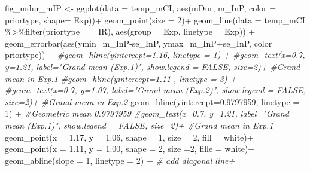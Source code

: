 \documentclass[
]{article}
\newenvironment{Shaded}{\begin{snugshade}}{\end{snugshade}}
\newcommand{\AttributeTok}[1]{\textcolor[rgb]{0.77,0.63,0.00}{#1}}
\newcommand{\CommentTok}[1]{\textcolor[rgb]{0.56,0.35,0.01}{\textit{#1}}}
\newcommand{\DecValTok}[1]{\textcolor[rgb]{0.00,0.00,0.81}{#1}}
\newcommand{\FloatTok}[1]{\textcolor[rgb]{0.00,0.00,0.81}{#1}}
\newcommand{\FunctionTok}[1]{\textcolor[rgb]{0.00,0.00,0.00}{#1}}
\newcommand{\NormalTok}[1]{#1}
\newcommand{\OtherTok}[1]{\textcolor[rgb]{0.56,0.35,0.01}{#1}}
\newcommand{\SpecialCharTok}[1]{\textcolor[rgb]{0.00,0.00,0.00}{#1}}
\newcommand{\StringTok}[1]{\textcolor[rgb]{0.31,0.60,0.02}{#1}}
\begin{document}
\begin{Shaded}
\begin{Highlighting}[]
\NormalTok{fig\_mdur\_mIP }\OtherTok{\textless{}{-}} \FunctionTok{ggplot}\NormalTok{(}\AttributeTok{data =}\NormalTok{ temp\_mCI, }\FunctionTok{aes}\NormalTok{(mDur, m\_InP, }\AttributeTok{color =}\NormalTok{ priortype, }\AttributeTok{shape=}\NormalTok{ Exp))}\SpecialCharTok{+}
  \FunctionTok{geom\_point}\NormalTok{(}\AttributeTok{size =} \DecValTok{2}\NormalTok{)}\SpecialCharTok{+}
  \FunctionTok{geom\_line}\NormalTok{(}\AttributeTok{data =}\NormalTok{ temp\_mCI }\SpecialCharTok{\%\textgreater{}\%}\FunctionTok{filter}\NormalTok{(priortype }\SpecialCharTok{==} \StringTok{\textquotesingle{}IR\textquotesingle{}}\NormalTok{), }\FunctionTok{aes}\NormalTok{(}\AttributeTok{group =}\NormalTok{ Exp, }\AttributeTok{linetype =}\NormalTok{ Exp)) }\SpecialCharTok{+}
  \FunctionTok{geom\_errorbar}\NormalTok{(}\FunctionTok{aes}\NormalTok{(}\AttributeTok{ymin=}\NormalTok{m\_InP}\SpecialCharTok{{-}}\NormalTok{se\_InP, }\AttributeTok{ymax=}\NormalTok{m\_InP}\SpecialCharTok{+}\NormalTok{se\_InP, }\AttributeTok{color =}\NormalTok{ priortype)) }\SpecialCharTok{+} 
  \CommentTok{\#geom\_hline(yintercept=1.16, linetype = 1) + }
  \CommentTok{\#geom\_text(x=0.7, y=1.21, label="Grand mean (Exp.1)", show.legend = FALSE, size=2)+ \#Grand mean in Exp.1}
  \CommentTok{\#geom\_hline(yintercept=1.11 , linetype = 3) + }
  \CommentTok{\#geom\_text(x=0.7, y=1.07, label="Grand mean (Exp.2)", show.legend = FALSE, size=2)+ \#Grand mean in Exp.2}
  \FunctionTok{geom\_hline}\NormalTok{(}\AttributeTok{yintercept=}\FloatTok{0.9797959}\NormalTok{, }\AttributeTok{linetype =} \DecValTok{1}\NormalTok{) }\SpecialCharTok{+}  \CommentTok{\#Geometric mean 0.9797959}
  \CommentTok{\#geom\_text(x=0.7, y=1.21, label="Grand mean (Exp.1)", show.legend = FALSE, size=2)+ \#Grand mean in Exp.1}
  \FunctionTok{geom\_point}\NormalTok{(}\AttributeTok{x =} \FloatTok{1.17}\NormalTok{, }\AttributeTok{y =} \FloatTok{1.06}\NormalTok{, }\AttributeTok{shape =} \DecValTok{1}\NormalTok{, }\AttributeTok{size =} \DecValTok{2}\NormalTok{, }\AttributeTok{fill =} \StringTok{\textquotesingle{}white\textquotesingle{}}\NormalTok{)}\SpecialCharTok{+}
  \FunctionTok{geom\_point}\NormalTok{(}\AttributeTok{x =} \FloatTok{1.11}\NormalTok{, }\AttributeTok{y =} \FloatTok{1.00}\NormalTok{, }\AttributeTok{shape =} \DecValTok{2}\NormalTok{, }\AttributeTok{size =}\DecValTok{2}\NormalTok{, }\AttributeTok{fille =} \StringTok{\textquotesingle{}white\textquotesingle{}}\NormalTok{)}\SpecialCharTok{+}
  \FunctionTok{geom\_abline}\NormalTok{(}\AttributeTok{slope =} \DecValTok{1}\NormalTok{, }\AttributeTok{linetype =} \DecValTok{2}\NormalTok{) }\SpecialCharTok{+} \CommentTok{\# add diagonal line+}

\end{Highlighting}
\end{Shaded}
\end{document}
